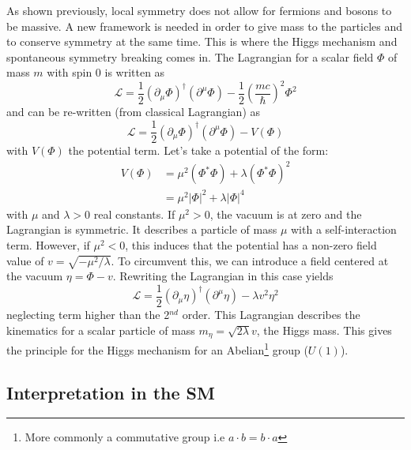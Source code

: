 As shown previously, local symmetry does not allow for fermions and bosons to be massive. A new framework is needed in order to give mass to the particles and to conserve symmetry at the same time. This is where the Higgs mechanism and spontaneous symmetry breaking comes in. The Lagrangian for a scalar field $\Phi$ of mass $m$ with spin 0 is written as \cite{Griffiths:343277}
\begin{equation}
  \mathcal{L} = \frac{1}{2}(\partial_{\mu}\Phi)^{\dagger}(\partial^{\mu}\Phi) - \frac{1}{2}\left(\frac{mc}{\hbar}\right)^2\Phi^2
\end{equation}
and can be re-written (from classical Lagrangian) as
\begin{equation} \label{eq:HiggsLag}
  \mathcal{L} = \frac{1}{2}(\partial_{\mu}\Phi)^{\dagger}(\partial^{\mu}\Phi) - V(\Phi)
\end{equation}
with $V(\Phi)$ the potential term. Let's take a potential of the form:
\begin{equation}
  \begin{aligned}
    V(\Phi) & = \mu^2(\Phi^*\Phi) + \lambda(\Phi^*\Phi)^2 \\
    & = \mu^2|\Phi|^2 + \lambda|\Phi|^4
  \end{aligned}
\end{equation}
with $\mu$ and $\lambda > 0$ real constants. If $\mu^2 > 0$, the vacuum is at zero and the Lagrangian is symmetric. It describes a particle of mass $\mu$ with a self-interaction term. However, if $\mu^2 < 0$, this induces that the potential has a non-zero field value of $v = \sqrt{-\mu^2/\lambda}$. To circumvent this, we can introduce a field centered at the vacuum $\eta = \Phi - v$. Rewriting the Lagrangian in this case yields
\begin{equation}
  \mathcal{L} = \frac{1}{2}(\partial_{\mu}\eta)^{\dagger}(\partial^{\mu}\eta) - \lambda v^2\eta^2
\end{equation}
neglecting term higher than the 2$^{nd}$ order. This Lagrangian describes the kinematics for a scalar particle of mass $m_{\eta} = \sqrt{2\lambda}v$, the Higgs mass. This gives the principle for the Higgs mechanism for an Abelian\footnote{More commonly a commutative group i.e $a \cdot b = b \cdot a$} group ($U(1)$).

\subsection{Interpretation in the SM}

